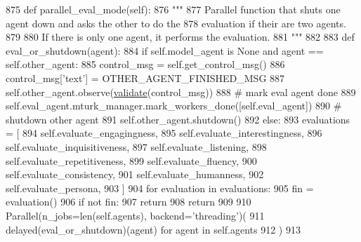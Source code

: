 \begin{DoxyCode}
875     \textcolor{keyword}{def }parallel\_eval\_mode(self):
876         \textcolor{stringliteral}{"""}
877 \textcolor{stringliteral}{        Parallel function that shuts one agent down and asks the other to do the}
878 \textcolor{stringliteral}{        evaluation if their are two agents.}
879 \textcolor{stringliteral}{}
880 \textcolor{stringliteral}{        If there is only one agent, it performs the evaluation.}
881 \textcolor{stringliteral}{        """}
882 
883         \textcolor{keyword}{def }eval\_or\_shutdown(agent):
884             \textcolor{keywordflow}{if} self.model\_agent \textcolor{keywordflow}{is} \textcolor{keywordtype}{None} \textcolor{keywordflow}{and} agent == self.other\_agent:
885                 control\_msg = self.get\_control\_msg()
886                 control\_msg[\textcolor{stringliteral}{'text'}] = OTHER\_AGENT\_FINISHED\_MSG
887                 self.other\_agent.observe(\hyperlink{namespaceparlai_1_1core_1_1worlds_afc3fad603b7bce41dbdc9cdc04a9c794}{validate}(control\_msg))
888                 \textcolor{comment}{# mark eval agent done}
889                 self.eval\_agent.mturk\_manager.mark\_workers\_done([self.eval\_agent])
890                 \textcolor{comment}{# shutdown other agent}
891                 self.other\_agent.shutdown()
892             \textcolor{keywordflow}{else}:
893                 evaluations = [
894                     self.evaluate\_engagingness,
895                     self.evaluate\_interestingness,
896                     self.evaluate\_inquisitiveness,
897                     self.evaluate\_listening,
898                     self.evaluate\_repetitiveness,
899                     self.evaluate\_fluency,
900                     self.evaluate\_consistency,
901                     self.evaluate\_humanness,
902                     self.evaluate\_persona,
903                 ]
904                 \textcolor{keywordflow}{for} evaluation \textcolor{keywordflow}{in} evaluations:
905                     fin = evaluation()
906                     \textcolor{keywordflow}{if} \textcolor{keywordflow}{not} fin:
907                         \textcolor{keywordflow}{return}
908                 \textcolor{keywordflow}{return}
909 
910         Parallel(n\_jobs=len(self.agents), backend=\textcolor{stringliteral}{'threading'})(
911             delayed(eval\_or\_shutdown)(agent) \textcolor{keywordflow}{for} agent \textcolor{keywordflow}{in} self.agents
912         )
913 
\end{DoxyCode}
\mbox{\label{classprojects_1_1controllable__dialogue_1_1mturk_1_1worlds_1_1ControllableDialogEval_a948b46575dd83b3c2496dbf6b8c607d8}} 
